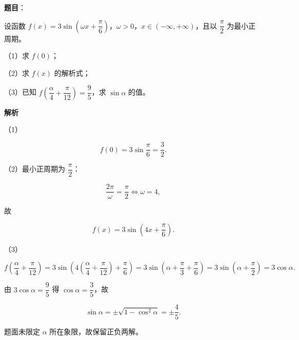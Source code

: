 \begin{answer}

\textbf{题目}：

设函数 $f(x)=3\sin\left(\omega x+\dfrac\pi6\right)$，$\omega>0$，$x\in(-\infty,+\infty)$，且以 $\dfrac\pi2$ 为最小正周期。

（1）求 $f(0)$；

（2）求 $f(x)$ 的解析式；

（3）已知 $f\left(\dfrac\alpha4+\dfrac\pi{12}\right)=\dfrac95$，求 $\sin\alpha$ 的值。

\textbf{解析}

（1）

\nopagebreak[4]
\[f(0)=3\sin\frac\pi6=\frac32.\]

（2）最小正周期为 $\dfrac\pi2$：

\nopagebreak[4]
\[\frac{2\pi}{\omega}=\frac\pi2\iff \omega=4,\]

故

\nopagebreak[4]
\[f(x)=3\sin\left(4x+\frac\pi6\right).\]

（3）

\nopagebreak[4]
\[f\left(\frac\alpha4+\frac\pi{12}\right)
=3\sin\left(4\left(\frac\alpha4+\frac\pi{12}\right)+\frac\pi6\right)
=3\sin\left(\alpha+\frac\pi3+\frac\pi6\right)
=3\sin\left(\alpha+\frac\pi2\right)=3\cos\alpha.\]

由 $3\cos\alpha=\dfrac95$ 得 $\cos\alpha=\dfrac35$，故

\nopagebreak[4]
\[\sin\alpha=\pm\sqrt{1-\cos^2\alpha}=\pm\frac45.\]

题面未限定 $\alpha$ 所在象限，故保留正负两解。


\end{answer}
